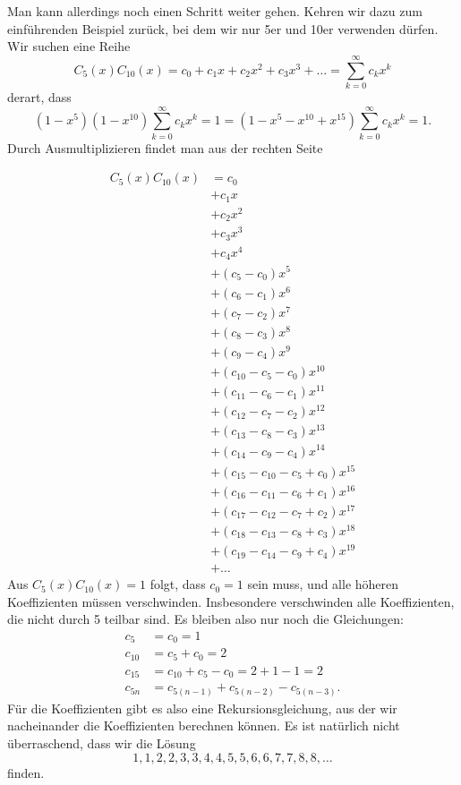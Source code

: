 Man kann allerdings noch einen Schritt weiter gehen.
Kehren wir dazu zum
einführenden Beispiel zurück, bei dem wir nur 5er und 10er verwenden
dürfen.
Wir suchen eine Reihe
\[
C_5(x)C_{10}(x)=c_0+c_1x+c_2x^2+c_3x^3+\dots=\sum_{k=0}^\infty c_kx^k
\]
derart, dass
\[
(1-x^5)(1-x^{10}) \sum_{k=0}^\infty c_kx^k=1
=
(1-x^5-x^{10}+x^{15}) \sum_{k=0}^\infty c_kx^k=1.
\]
Durch Ausmultiplizieren findet man aus der rechten Seite

{\allowdisplaybreaks
\begin{align*}
C_5(x)C_{10}(x)&=c_0\\
&+c_1x\\
&+c_2x^2\\
&+c_3x^3\\
&+c_4x^4\\
&+(c_5-c_0)x^5\\
&+(c_6-c_1)x^6\\
&+(c_7-c_2)x^7\\
&+(c_8-c_3)x^8\\
&+(c_9-c_4)x^9\\
&+(c_{10} - c_5 -c_0)x^{10}\\
&+(c_{11} - c_6 -c_1)x^{11}\\
&+(c_{12} - c_7 -c_2)x^{12}\\
&+(c_{13} - c_8 -c_3)x^{13}\\
&+(c_{14} - c_9 -c_4)x^{14}\\
&+(c_{15} - c_{10} - c_{5} +c_0)x^{15}\\
&+(c_{16} - c_{11} - c_{6} +c_1)x^{16}\\
&+(c_{17} - c_{12} - c_{7} +c_2)x^{17}\\
&+(c_{18} - c_{13} - c_{8} +c_3)x^{18}\\
&+(c_{19} - c_{14} - c_{9} +c_4)x^{19}\\
&+\dots
\end{align*}
}
Aus $C_{5}(x)C_{10}(x)=1$ folgt, dass $c_0=1$ sein muss, und alle
höheren Koeffizienten müssen verschwinden.
Insbesondere verschwinden
alle Koeffizienten, die nicht durch 5 teilbar sind.
Es bleiben also nur noch
die Gleichungen:
\begin{align*}
c_5&=c_0=1\\
c_{10}&=c_5+c_0=2\\
c_{15}&=c_{10}+c_{5}-c_0=2 + 1 - 1=2\\
c_{5n}&=c_{5(n-1)}+c_{5(n-2)}-c_{5(n-3)}.
\end{align*}
Für die Koeffizienten gibt es also eine Rekursionsgleichung, aus der wir
nacheinander die Koeffizienten berechnen können.
Es ist natürlich nicht
überraschend, dass wir die Lösung
\[
1, 1, 2, 2, 3, 3, 4, 4, 5, 5, 6, 6, 7, 7, 8, 8, \dots
\]
finden.

